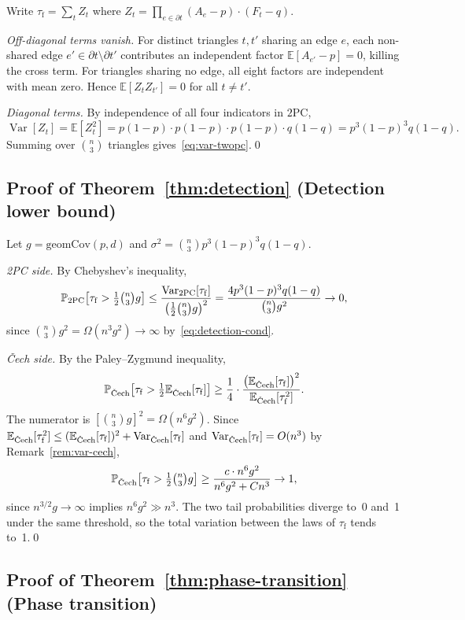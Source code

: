 \documentclass[reqno,12pt]{amsart}
\newcommand{\tauf}{\tau_{\mathrm{f}}}
\newcommand{\PC}{\mathrm{2PC}}
\newcommand{\Cech}{\ifmmode\text{\v{C}ech}\else\v{C}ech\fi}  %
\newcommand{\geomCov}{\mathrm{geomCov}}
\newcommand{\EE}{\mathbb{E}}
\newcommand{\PP}{\mathbb{P}}
\DeclareMathOperator{\Var}{Var}
\theoremstyle{plain}
\theoremstyle{definition}
\theoremstyle{remark}
\begin{document}
Write $\tauf = \sum_t Z_t$ where $Z_t = \prod_{e\in\partial t}(A_e-p)\cdot(F_t-q)$.

\textit{Off-diagonal terms vanish.} For distinct triangles $t, t'$ sharing an edge $e$, each
non-shared edge $e'\in\partial t\setminus\partial t'$ contributes an independent factor
$\EE[A_{e'}-p] = 0$, killing the cross term. For triangles sharing no edge, all eight
factors are independent with mean zero. Hence $\EE[Z_t Z_{t'}] = 0$ for all $t\neq t'$.

\textit{Diagonal terms.} By independence of all four indicators in $\PC$,
\[
  \Var[Z_t] = \EE[Z_t^2]
  = p(1-p)\cdot p(1-p)\cdot p(1-p)\cdot q(1-q)
  = p^3(1-p)^3 q(1-q).
\]
Summing over $\binom{n}{3}$ triangles gives~\eqref{eq:var-twopc}.\qed

\subsection*{Proof of Theorem~\ref{thm:detection} (Detection lower bound)}

Let $g = \geomCov(p,d)$ and $\sigma^2 = \binom{n}{3}p^3(1-p)^3 q(1-q)$.

\textit{2PC side.} By Chebyshev's inequality,
\[
  \PP_{\PC}\!\left[\tauf > \tfrac{1}{2}\tbinom{n}{3} g\right]
  \leq \frac{\Var_{\PC}[\tauf]}{\bigl(\frac{1}{2}\binom{n}{3}g\bigr)^2}
  = \frac{4p^3(1-p)^3 q(1-q)}{\binom{n}{3}g^2} \to 0,
\]
since $\binom{n}{3}g^2 = \Omega(n^3 g^2)\to\infty$ by~\eqref{eq:detection-cond}.

\textit{\v{C}ech side.} By the Paley--Zygmund inequality,
\[
  \PP_{\Cech}\!\left[\tauf > \tfrac{1}{2}\EE_{\Cech}[\tauf]\right]
  \geq \frac{1}{4}\cdot\frac{\bigl(\EE_{\Cech}[\tauf]\bigr)^2}{\EE_{\Cech}[\tauf^2]}.
\]
The numerator is $[\binom{n}{3}g]^2 = \Omega(n^6 g^2)$. Since
$\EE_{\Cech}[\tauf^2] \leq (\EE_{\Cech}[\tauf])^2 + \Var_{\Cech}[\tauf]$ and
$\Var_{\Cech}[\tauf] = O(n^3)$ by Remark~\ref{rem:var-cech},
\[
  \PP_{\Cech}\!\left[\tauf > \tfrac{1}{2}\tbinom{n}{3}g\right]
  \geq \frac{c\cdot n^6 g^2}{n^6 g^2 + C n^3} \to 1,
\]
since $n^{3/2}g\to\infty$ implies $n^6 g^2\gg n^3$. The two tail probabilities diverge to~0
and~1 under the same threshold, so the total variation between the laws of $\tauf$ tends to~1.\qed

\subsection*{Proof of Theorem~\ref{thm:phase-transition} (Phase transition)}
\end{document}
